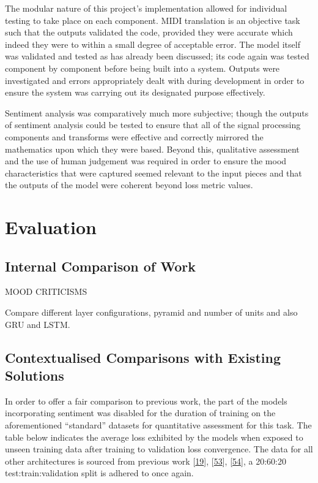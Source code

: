 \documentclass[12pt,]{article}
\begin{document}
The modular nature of this project's implementation allowed for
individual testing to take place on each component. MIDI translation is
an objective task such that the outputs validated the code, provided
they were accurate which indeed they were to within a small degree of
acceptable error. The model itself was validated and tested as has
already been discussed; its code again was tested component by component
before being built into a system. Outputs were investigated and errors
appropriately dealt with during development in order to ensure the
system was carrying out its designated purpose effectively.

Sentiment analysis was comparatively much more subjective; though the
outputs of sentiment analysis could be tested to ensure that all of the
signal processing components and transforms were effective and correctly
mirrored the mathematics upon which they were based. Beyond this,
qualitative assessment and the use of human judgement was required in
order to ensure the mood characteristics that were captured seemed
relevant to the input pieces and that the outputs of the model were
coherent beyond loss metric values.

\hypertarget{evaluation}{%
\section{Evaluation}\label{evaluation}}

\hypertarget{internal-comparison-of-work}{%
\subsection{Internal Comparison of
Work}\label{internal-comparison-of-work}}

MOOD CRITICISMS

Compare different layer configurations, pyramid and number of units and
also GRU and LSTM.

\hypertarget{contextualised-comparisons-with-existing-solutions}{%
\subsection{Contextualised Comparisons with Existing
Solutions}\label{contextualised-comparisons-with-existing-solutions}}

In order to offer a fair comparison to previous work, the part of the
models incorporating sentiment was disabled for the duration of training
on the aforementioned ``standard'' datasets for quantitative assessment
for this task. The table below indicates the average loss exhibited by
the models when exposed to unseen training data after training to
validation loss convergence. The data for all other architectures is
sourced from previous work
{[}\protect\hyperlink{ref-boulanger2012modeling}{19}{]},
{[}\protect\hyperlink{ref-johnson2017generating}{53}{]},
{[}\protect\hyperlink{ref-vohra2015modeling}{54}{]}, a 20:60:20
test:train:validation split is adhered to once again.
\end{document}
